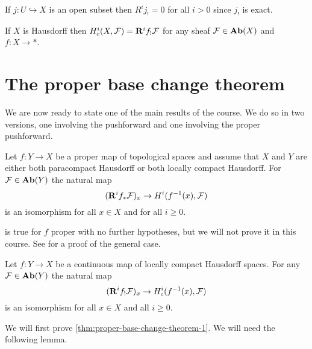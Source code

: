 \begin{exc}
	If $j: U \hookrightarrow X$ is an open subset then $R^ij_! = 0$ for all $i > 0$ since $j_!$ is exact.
\end{exc}

\begin{exc}
	If $X$ is Hausdorff then $\cohomology^i_c(X, \sh{F}) = \rightderived^i f_!\sh{F}$ for any sheaf $\mathcal{F} \in \operatorname{\mathbf{Ab}}(X)$ and $f\colon X \to *$. 
\end{exc}

\section{The proper base change theorem}
We are now ready to state one of the main results of the course. We do so in two versions, one involving the pushforward and one involving the proper pushforward.

\begin{thm}\label{thm:proper-base-change-theorem-1}
	Let $f: Y \to X$ be a proper map of topological spaces and assume that $X$ and $Y$ are either both paracompact Hausdorff or both locally compact Hausdorff. For $\mathcal{F} \in \operatorname{\mathbf{Ab}}(Y)$ the natural map \[
    	(\rightderived^i f_* \sh{F})_x \to \cohomology^i(f^{-1}(x), \sh{F})
    \] is an isomorphism for all $x \in X$ and for all $i \geq 0$. 
\end{thm}

\begin{rmk}
	 is true for $f$ proper with no further hypotheses, but we will not prove it in this course. See \cite[Lemma 09V6]{stacks-project} for a proof of the general case. 
\end{rmk}

\begin{thm}\label{thm:proper-base-changed-theorem-2}
	Let $f: Y \to X$ be a continuous map of locally compact Hausdorff spaces. For any $\mathcal{F} \in \operatorname{\mathbf{Ab}}(Y)$ the natural map \[
    	(\rightderived^i f_! \sh{F})_x \to \cohomology^i_c(f^{-1}(x), \sh{F})
    \] is an isomorphism for all $x \in X$ and all $i \geq 0$.
\end{thm}

We will first prove \cref{thm:proper-base-change-theorem-1}. We will need the following lemma.

